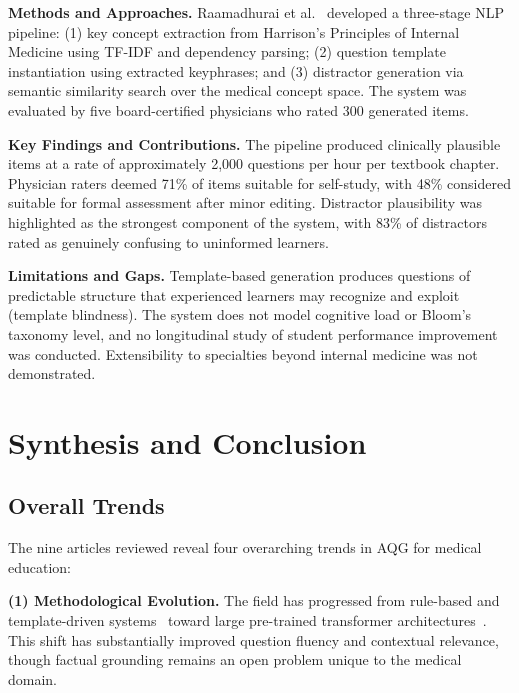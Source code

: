 \documentclass[conference]{IEEEtran}
\begin{document}
\textbf{Methods and Approaches.} Raamadhurai et al.~\cite{raamadhurai2019nlp} developed a three-stage NLP pipeline: (1) key concept extraction from Harrison's Principles of Internal Medicine using TF-IDF and dependency parsing; (2) question template instantiation using extracted keyphrases; and (3) distractor generation via semantic similarity search over the medical concept space. The system was evaluated by five board-certified physicians who rated 300 generated items.

\textbf{Key Findings and Contributions.} The pipeline produced clinically plausible items at a rate of approximately 2,000 questions per hour per textbook chapter. Physician raters deemed 71\% of items suitable for self-study, with 48\% considered suitable for formal assessment after minor editing. Distractor plausibility was highlighted as the strongest component of the system, with 83\% of distractors rated as genuinely confusing to uninformed learners.

\textbf{Limitations and Gaps.} Template-based generation produces questions of predictable structure that experienced learners may recognize and exploit (template blindness). The system does not model cognitive load or Bloom's taxonomy level, and no longitudinal study of student performance improvement was conducted. Extensibility to specialties beyond internal medicine was not demonstrated.

\section{Synthesis and Conclusion}
\label{sec:synthesis}

\subsection{Overall Trends}

The nine articles reviewed reveal four overarching trends in AQG for medical education:

\textbf{(1) Methodological Evolution.} The field has progressed from rule-based and template-driven systems~\cite{leo2019ontology,raamadhurai2019nlp} toward large pre-trained transformer architectures~\cite{ghanem2022medical,wang2022towards,steuer2021mcq}. This shift has substantially improved question fluency and contextual relevance, though factual grounding remains an open problem unique to the medical domain.
\end{document}
